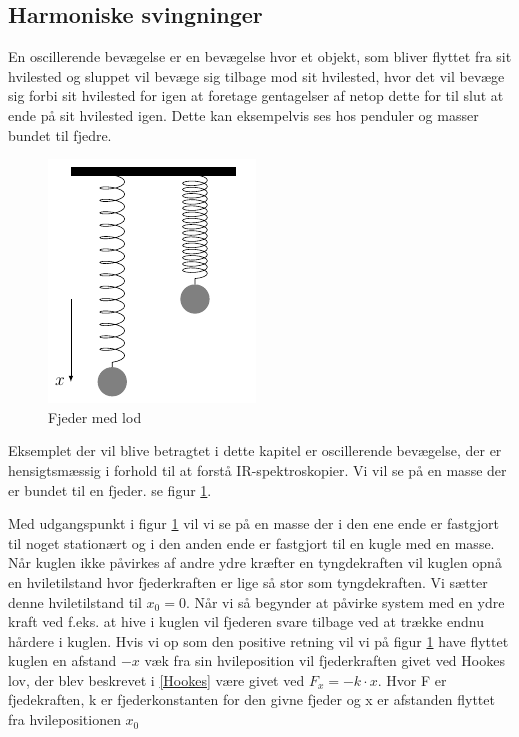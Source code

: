 \subsection{Harmoniske svingninger}\label{teori: Harmoniske svingninger}
En oscillerende bevægelse er en bevægelse hvor et objekt, som bliver flyttet fra sit hvilested og sluppet vil bevæge sig tilbage mod sit hvilested, hvor det vil bevæge sig forbi sit hvilested for igen at foretage gentagelser af netop dette for til slut at ende på sit hvilested igen. Dette kan eksempelvis ses hos penduler og masser bundet til fjedre.
\\

\begin{figure}
\centering
\includegraphics[scale=1]{Billeder/fjeder}
\caption{Fjeder med lod \label{fig:fjeder}}
\end{figure} 

Eksemplet der vil blive betragtet i dette kapitel er oscillerende bevægelse, der er hensigtsmæssig i forhold til at forstå IR-spektroskopier. Vi vil se på en masse der er bundet til en fjeder. se figur \ref{fig:fjeder}.

Med udgangspunkt i figur \ref{fig:fjeder} vil vi se på en masse der i den ene ende er fastgjort til noget stationært og i den anden ende er fastgjort til en kugle med en masse. Når kuglen ikke påvirkes af andre ydre kræfter en tyngdekraften vil kuglen opnå en hviletilstand hvor fjederkraften er lige så stor som tyngdekraften. Vi sætter denne hviletilstand til $x_0=0$. Når vi så begynder at påvirke system med en ydre kraft ved f.eks. at hive i kuglen vil fjederen svare tilbage ved at trække endnu hårdere i kuglen. Hvis vi op som den positive retning vil vi på figur \ref{fig:fjeder} have flyttet kuglen en afstand $-x$ væk fra sin hvileposition vil fjederkraften givet ved Hookes lov, der blev beskrevet i \ref{Hookes} være givet ved $F_x=-k \cdot x$. Hvor F er fjedekraften, k er fjederkonstanten for den givne fjeder og x er afstanden flyttet fra hvilepositionen $x_0$
